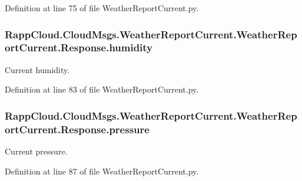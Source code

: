 Definition at line 75 of file Weather\-Report\-Current.\-py.

\hypertarget{classRappCloud_1_1CloudMsgs_1_1WeatherReportCurrent_1_1WeatherReportCurrent_1_1Response_aec8bf35b5719955810af5f60937fbc33}{
\subsubsection[{humidity}]{\setlength{\rightskip}{0pt plus 5cm}Rapp\-Cloud.\-Cloud\-Msgs.\-Weather\-Report\-Current.\-Weather\-Report\-Current.\-Response.\-humidity}}\label{classRappCloud_1_1CloudMsgs_1_1WeatherReportCurrent_1_1WeatherReportCurrent_1_1Response_aec8bf35b5719955810af5f60937fbc33}


Current humidity. 



Definition at line 83 of file Weather\-Report\-Current.\-py.

\hypertarget{classRappCloud_1_1CloudMsgs_1_1WeatherReportCurrent_1_1WeatherReportCurrent_1_1Response_a7fc449dcfc75adac06186b75e1fb3aec}{
\subsubsection[{pressure}]{\setlength{\rightskip}{0pt plus 5cm}Rapp\-Cloud.\-Cloud\-Msgs.\-Weather\-Report\-Current.\-Weather\-Report\-Current.\-Response.\-pressure}}\label{classRappCloud_1_1CloudMsgs_1_1WeatherReportCurrent_1_1WeatherReportCurrent_1_1Response_a7fc449dcfc75adac06186b75e1fb3aec}


Current pressure. 



Definition at line 87 of file Weather\-Report\-Current.\-py.

